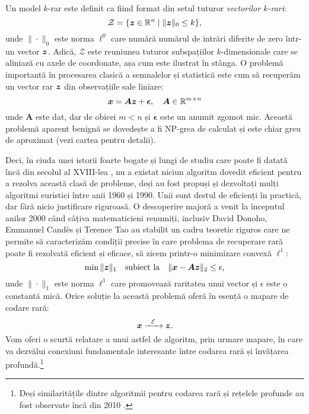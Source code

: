 \documentclass[../../book-main_ro.tex]{subfiles}
\begin{document}
Un model $k$-rar este definit ca fiind format din setul tuturor {\em vectorilor $k$-rari}:
\begin{equation}
    \mathcal{Z} = \{\bm{z} \in \mathbb{R}^n \mid \|\bm{z}\|_0 \le k\},
\end{equation}
unde $\| \cdot \|_0$ este norma $\ell^0$ care numără numărul de intrări diferite de zero într-un vector $\bm{z}$. Adică, $\mathcal{Z}$ este reuniunea tuturor subspațiilor $k$-dimensionale care se aliniază cu axele de coordonate, așa cum este ilustrat în  stânga. O problemă importantă în procesarea clasică a semnalelor și statistică este cum să recuperăm un vector rar $\bm{z}$ din observațiile sale liniare:
\begin{equation}
    \bm{x} = \boldsymbol{A} \bm{z} + \boldsymbol{\epsilon}, \quad \boldsymbol{A} \in \mathbb{R}^{m\times n}
    \label{eqn:sparse-model}
\end{equation}
unde $\boldsymbol{A}$ este dat, dar de obicei $m < n$ și $\boldsymbol{\epsilon}$ este un anumit zgomot mic. Această problemă aparent benignă se dovedește a fi NP-grea de calculat și este chiar greu de aproximat (vezi cartea \cite{Wright-Ma-2022} pentru detalii).

Deci, în ciuda unei istorii foarte bogate și lungi de studiu care poate fi datată încă din secolul al XVIII-lea \cite{Boscovichca1750}, nu a existat niciun algoritm dovedit eficient pentru a rezolva această clasă de probleme, deși au fost propuși și dezvoltați mulți algoritmi euristici între anii 1960 și 1990. Unii sunt destul de eficienți în practică, dar fără nicio justificare riguroasă. O descoperire majoră a venit la începutul anilor 2000 când câțiva matematicieni renumiți, inclusiv David Donoho, Emmanuel Cand\`{e}s și Terence Tao \cite{donoho2005neighborly,Candes2005,CandesE2005-IT} au stabilit un cadru teoretic riguros care ne permite să caracterizăm condiții precise în care problema de recuperare rară poate fi rezolvată eficient și eficace, să zicem printr-o minimizare convexă $\ell^1$:
\begin{equation}
    \min \|\bm{z}\|_1 \quad \mbox{subiect la} \quad \| \bm{x} - \boldsymbol{A}\bm{z}\|_2 \le \epsilon,
\end{equation}
unde $\|\cdot \|_1$ este norma $\ell^1$ care promovează raritatea unui vector și $\epsilon$ este o constantă mică. Orice soluție la această problemă oferă în esență o mapare de codare rară:
\begin{equation}
    \bm{x}   \xrightarrow{\hspace{2mm} \mathcal{E} \hspace{2mm}}  \bm{z}.
       \label{eqn:decoding-sparse}
\end{equation}
Vom oferi o scurtă relatare a unui astfel de algoritm, prin urmare mapare, în  care va dezvălui conexiuni fundamentale interesante între codarea rară și învățarea profundă.\footnote{Deși similaritățile dintre algoritmii pentru codarea rară și rețelele profunde au fost observate încă din 2010 \cite{gregor2010learning}.}
\end{document}
